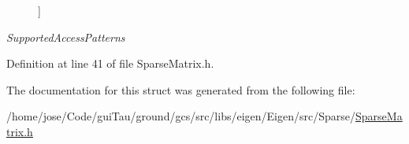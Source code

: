 \begin{Desc}
\begin{description}
{}]\item[{\em 
\hypertarget{structei__traits_3_01_sparse_matrix_3_01___scalar_00_01___flags_01_4_01_4_ae805feeaa4898eeaa7b75619a03eb834adb5060dd7aeeb785d7ba7acbc580040f}{Supported\-Access\-Patterns}\label{structei__traits_3_01_sparse_matrix_3_01___scalar_00_01___flags_01_4_01_4_ae805feeaa4898eeaa7b75619a03eb834adb5060dd7aeeb785d7ba7acbc580040f}
}]\end{description}
\end{Desc}


Definition at line 41 of file Sparse\-Matrix.\-h.



The documentation for this struct was generated from the following file\-:\begin{DoxyCompactItemize}
\item 
/home/jose/\-Code/gui\-Tau/ground/gcs/src/libs/eigen/\-Eigen/src/\-Sparse/\hyperlink{_sparse_matrix_8h}{Sparse\-Matrix.\-h}\end{DoxyCompactItemize}
